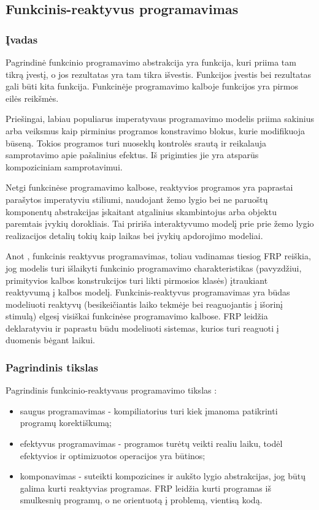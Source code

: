 \subsection{Funkcinis-reaktyvus programavimas}

\subsubsection{Įvadas}

Pagrindinė funkcinio programavimo abstrakcija yra funkcija, kuri priima tam tikrą įvestį, o jos rezultatas yra tam tikra išvestis. Funkcijos įvestis bei rezultatas gali būti kita funkcija. Funkcinėje programavimo kalboje funkcijos yra pirmos eilės reikšmės.

Priešingai, labiau populiarus imperatyvaus programavimo modelis priima sakinius arba veiksmus kaip pirminius programos konstravimo blokus, kurie modifikuoja būseną. Tokios programos turi nuoseklų kontrolės srautą ir reikalauja samprotavimo apie pašalinius efektus. Iš prigimties jie yra atsparūs kompoziciniam samprotavimui.

Netgi funkcinėse programavimo kalbose, reaktyvios programos yra paprastai parašytos imperatyviu stiliumi, naudojant žemo lygio bei ne paruoštų komponentų abstrakcijas įskaitant atgalinius skambintojus arba objektu paremtais įvykių dorokliais. Tai pririša interaktyvumo modelį prie prie žemo lygio realizacijos detalių tokių kaip laikas bei įvykių apdorojimo modeliai.

Anot \cite{Survey}, funkcinis reaktyvus programavimas, toliau vadinamas tiesiog FRP reiškia, jog modelis turi išlaikyti funkcinio programavimo charakteristikas (pavyzdžiui, primityvios kalbos konstrukcijos turi likti pirmosios klasės) įtraukiant reaktyvumą į kalbos modelį. Funkcinis-reaktyvus programavimas yra būdas modeliuoti reaktyvų (besikeičiantis laiko tekmėje bei reaguojantis į išorinį stimulą) elgesį visiškai funkcinėse programavimo kalbose. FRP leidžia deklaratyviu ir paprastu būdu modeliuoti sistemas, kurios turi reaguoti į duomenis bėgant laikui.

\subsubsection{Pagrindinis tikslas}

Pagrindinis funkcinio-reaktyvaus programavimo tikslas \cite{Survey}:

\begin{itemize}

	\item saugus programavimas - kompiliatorius turi kiek įmanoma patikrinti programų korektiškumą;

	\item efektyvus programavimas - programos turėtų veikti realiu laiku, todėl efektyvios ir optimizuotos operacijos yra būtinos;

	\item komponavimas - suteikti kompozicines ir aukšto lygio abstrakcijas, jog būtų galima kurti reaktyvias programas. FRP leidžia kurti programas iš smulkesnių programų, o ne orientuotą į problemą, vientisą kodą.

\end{itemize}


